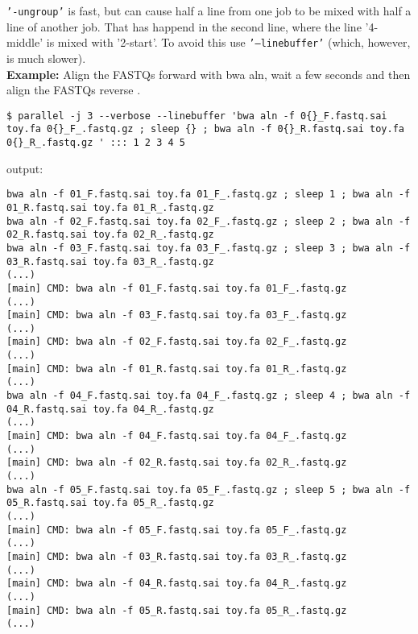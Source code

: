\documentclass{article}
\newcommand{\example}[1]{
\textbf{Example: } {\color[rgb]{0,0,1} #1 } .
}
\newcommand{\cmdoption}[1]{\texttt{'#1'}}
\begin{document}
\cmdoption{-ungroup} is fast, but can cause half a line from one job to be mixed with half a line of another job. That has happend in the second line, where the line '4-middle' is mixed with '2-start'. To avoid this use \cmdoption{--linebuffer} (which, however, is much slower).\\
\example{Align the FASTQs forward with bwa aln, wait a few seconds and then align the FASTQs reverse }
\begin{lstlisting}
$ parallel -j 3 --verbose --linebuffer 'bwa aln -f 0{}_F.fastq.sai toy.fa 0{}_F_.fastq.gz ; sleep {} ; bwa aln -f 0{}_R.fastq.sai toy.fa 0{}_R_.fastq.gz ' ::: 1 2 3 4 5
\end{lstlisting}
output:
\begin{lstlisting}
bwa aln -f 01_F.fastq.sai toy.fa 01_F_.fastq.gz ; sleep 1 ; bwa aln -f 01_R.fastq.sai toy.fa 01_R_.fastq.gz 
bwa aln -f 02_F.fastq.sai toy.fa 02_F_.fastq.gz ; sleep 2 ; bwa aln -f 02_R.fastq.sai toy.fa 02_R_.fastq.gz 
bwa aln -f 03_F.fastq.sai toy.fa 03_F_.fastq.gz ; sleep 3 ; bwa aln -f 03_R.fastq.sai toy.fa 03_R_.fastq.gz 
(...)
[main] CMD: bwa aln -f 01_F.fastq.sai toy.fa 01_F_.fastq.gz
(...)
[main] CMD: bwa aln -f 03_F.fastq.sai toy.fa 03_F_.fastq.gz
(...)
[main] CMD: bwa aln -f 02_F.fastq.sai toy.fa 02_F_.fastq.gz
(...)
[main] CMD: bwa aln -f 01_R.fastq.sai toy.fa 01_R_.fastq.gz
(...)
bwa aln -f 04_F.fastq.sai toy.fa 04_F_.fastq.gz ; sleep 4 ; bwa aln -f 04_R.fastq.sai toy.fa 04_R_.fastq.gz 
(...)
[main] CMD: bwa aln -f 04_F.fastq.sai toy.fa 04_F_.fastq.gz
(...)
[main] CMD: bwa aln -f 02_R.fastq.sai toy.fa 02_R_.fastq.gz
(...)
bwa aln -f 05_F.fastq.sai toy.fa 05_F_.fastq.gz ; sleep 5 ; bwa aln -f 05_R.fastq.sai toy.fa 05_R_.fastq.gz 
(...)
[main] CMD: bwa aln -f 05_F.fastq.sai toy.fa 05_F_.fastq.gz
(...)
[main] CMD: bwa aln -f 03_R.fastq.sai toy.fa 03_R_.fastq.gz
(...)
[main] CMD: bwa aln -f 04_R.fastq.sai toy.fa 04_R_.fastq.gz
(...)
[main] CMD: bwa aln -f 05_R.fastq.sai toy.fa 05_R_.fastq.gz
(...)
\end{lstlisting}
\end{document}

